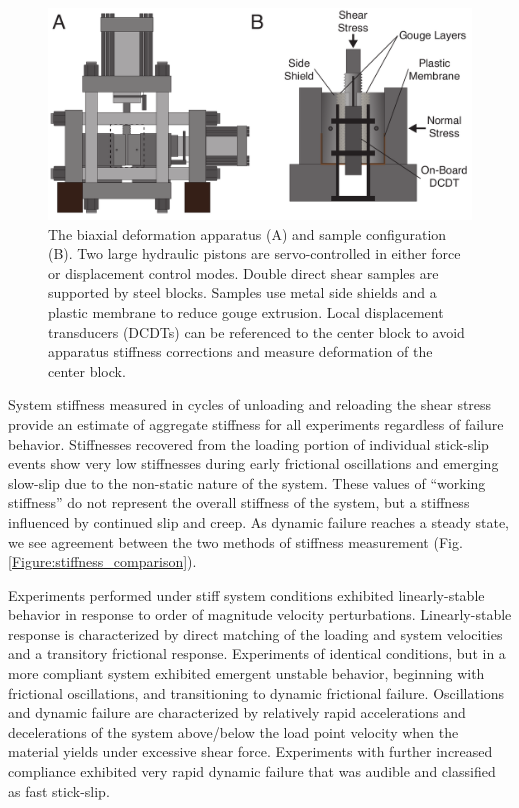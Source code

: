 \documentclass[11pt]{article}
\begin{document}
\begin{figure}
	\centering
	\includegraphics[scale=0.5]{../Figures/Fig_Biax_Schematic/biax_schematic.pdf}
   	\caption{The biaxial deformation apparatus (A) and sample configuration (B).
   	Two large hydraulic pistons are servo-controlled in either force or
   	displacement control modes. Double direct shear samples are supported by
   	steel blocks. Samples use metal side shields and a plastic membrane to
   	reduce gouge extrusion.  Local displacement transducers (DCDTs) can be
   	referenced to the center block to avoid apparatus stiffness corrections and
   	measure deformation of the center block.}
  	\label{Fig:Biax Schematic}
\end{figure}

System stiffness measured in cycles of unloading and reloading the shear stress
provide an estimate of aggregate stiffness for all experiments regardless of
failure behavior. Stiffnesses recovered from the loading portion of individual
stick-slip events show very low stiffnesses during early frictional oscillations
and emerging slow-slip due to the non-static nature of the system. These values
of “working stiffness” do not represent the overall stiffness of the system, but
a stiffness influenced by continued slip and creep. As dynamic failure reaches a
steady state, we see agreement between the two methods of stiffness measurement
(Fig.\ref{Figure:stiffness_comparison}).

Experiments performed under stiff system conditions exhibited linearly-stable
behavior in response to order of magnitude velocity perturbations.
Linearly-stable response is characterized by direct matching of the loading and
system velocities and a transitory frictional response. Experiments of identical
conditions, but in a more compliant system exhibited emergent unstable behavior,
beginning with frictional oscillations, and transitioning to dynamic frictional
failure. Oscillations and dynamic failure are characterized by relatively rapid
accelerations and decelerations of the system above/below the load point
velocity when the material yields under excessive shear force. Experiments with
further increased compliance exhibited very rapid dynamic failure that was
audible and classified as fast stick-slip.
\end{document}
